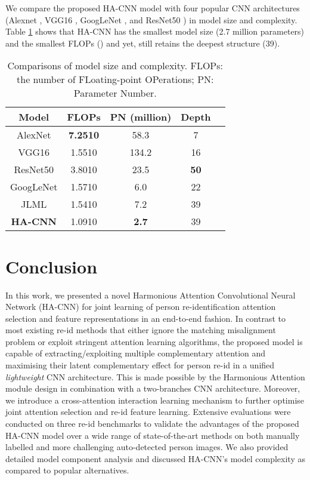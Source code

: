 \documentclass[10pt,twocolumn,letterpaper]{article}
\begin{document}
\vspace{0.2cm}
We compare the proposed HA-CNN model with 
four popular CNN architectures
(Alexnet \cite{krizhevsky2012imagenet},
VGG16 \cite{simonyan2014very},
GoogLeNet \cite{szegedy2015going}, and
ResNet50 \cite{he2016deep}) in model size and complexity.
Table \ref{tab:base_nets} shows that 
HA-CNN has the smallest model size (2.7 million parameters) 
and the  smallest FLOPs ()
and yet, still retains the  deepest structure (39).

\begin{table} [!h]
	\centering
\renewcommand{\arraystretch}{1}
	\setlength{\tabcolsep}{0.2 cm}
	\vspace{-0.3cm}
	\caption{ Comparisons of model size and complexity.
		FLOPs: the number of FLoating-point OPerations;
		PN: Parameter Number.
	}
\begin{tabular}{|c||c|c|c|c|}
		\hline
		Model  & FLOPs & PN (million) & Depth 
		\\ \hline
		AlexNet \cite{krizhevsky2012imagenet}
		& \bf 7.2510 & 58.3 & 7  \\ VGG16 \cite{simonyan2014very}
		&1.5510 & 134.2 & 16  \\ ResNet50 \cite{he2016deep}
		& 3.8010 & 23.5 & \bf 50 \\ GoogLeNet \cite{szegedy2015going}
		& 1.5710 & 6.0 & 22  \\  JLML &1.5410 & 7.2 & 39 \\ 
		\hline
\bf HA-CNN &1.0910 & \bf 2.7 & 39 \\ \hline
	\end{tabular}\label{tab:base_nets}
	\vspace{-0.35cm}
\end{table}

\section{Conclusion}
In this work, we presented a novel Harmonious Attention Convolutional Neural Network (HA-CNN)
for joint learning of person re-identification attention selection and feature representations
in an end-to-end fashion.
In contrast to most existing re-id methods
that either ignore the matching misalignment problem or 
exploit stringent attention learning algorithms, 
the proposed model is capable of extracting/exploiting multiple
complementary attention and maximising their latent complementary effect 
for person re-id in a unified {\em lightweight} CNN architecture.
This is made possible by the Harmonious Attention module design
in combination with a two-branches CNN architecture.
Moreover, we introduce a cross-attention interaction learning mechanism
to further optimise joint attention selection and re-id feature
learning.
Extensive evaluations were conducted on three re-id benchmarks to validate the advantages of
the proposed HA-CNN model over a wide range of state-of-the-art methods 
on both manually labelled and more challenging auto-detected person images.
We also provided detailed model component analysis and
discussed HA-CNN's model complexity as compared to popular alternatives.

{\small


}
\end{document}
